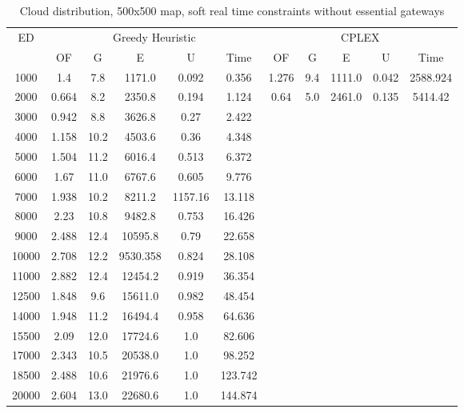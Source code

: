 \begin{table}[htb]
	\centering
	\begin{tabular}{|c|c|c|c|c|c|c|c|c|c|c|}
		\hline
		\multirow{2}{*}{ED} & \multicolumn{5}{c|}{Greedy Heuristic} & \multicolumn{5}{c|}{CPLEX}\\ 
		\cline{2-11}
& OF & G & E & U & Time & OF & G & E & U & Time\\ 
		\hline
		1000 & 1.4 & 7.8 & 1171.0 & 0.092 & 0.356 & 1.276 & 9.4 & 1111.0 & 0.042 & 2588.924 \\ 
		2000 & 0.664 & 8.2 & 2350.8 & 0.194 & 1.124 & 0.64 & 5.0 & 2461.0 & 0.135 & 5414.42 \\ 
		3000 & 0.942 & 8.8 & 3626.8 & 0.27 & 2.422 & & & & &  \\ 
		4000 & 1.158 & 10.2 & 4503.6 & 0.36 & 4.348 & & & & &  \\ 
		5000 & 1.504 & 11.2 & 6016.4 & 0.513 & 6.372 & & & & &  \\ 
		6000 & 1.67 & 11.0 & 6767.6 & 0.605 & 9.776 & & & & &  \\ 
		7000 & 1.938 & 10.2 & 8211.2 & 1157.16 & 13.118 & & & & &  \\ 
		8000 & 2.23 & 10.8 & 9482.8 & 0.753 & 16.426 & & & & &  \\ 
		9000 & 2.488 & 12.4 & 10595.8 & 0.79 & 22.658 & & & & &  \\ 
		10000 & 2.708 & 12.2 & 9530.358 & 0.824 & 28.108 & & & & &  \\ 
		11000 & 2.882 & 12.4 & 12454.2 & 0.919 & 36.354 & & & & &  \\ 
		12500 & 1.848 & 9.6 & 15611.0 & 0.982 & 48.454 & & & & &  \\ 
		14000 & 1.948 & 11.2 & 16494.4 & 0.958 & 64.636 & & & & &  \\ 
		15500 & 2.09 & 12.0 & 17724.6 & 1.0 & 82.606 & & & & &  \\ 
		17000 & 2.343 & 10.5 & 20538.0 & 1.0 & 98.252 & & & & &  \\ 
		18500 & 2.488 & 10.6 & 21976.6 & 1.0 & 123.742 & & & & &  \\ 
		20000 & 2.604 & 13.0 & 22680.6 & 1.0 & 144.874 & & & & &  \\ 
		\hline 
	\end{tabular} 
	\caption{Cloud distribution, 500x500 map, soft real time constraints without essential gateways} 
	\label{tab:cloud_soft_n_esc_500} 
\end{table} 

